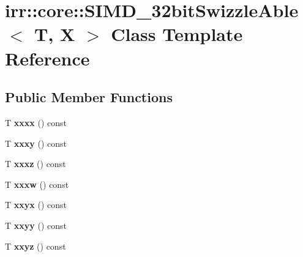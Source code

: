 \hypertarget{classirr_1_1core_1_1SIMD__32bitSwizzleAble}{}\section{irr\+:\+:core\+:\+:S\+I\+M\+D\+\_\+32bit\+Swizzle\+Able$<$ T, X $>$ Class Template Reference}
\label{classirr_1_1core_1_1SIMD__32bitSwizzleAble}
\subsection*{Public Member Functions}
\begin{DoxyCompactItemize}
\item 
T {\bfseries xxxx} () const \hypertarget{classirr_1_1core_1_1SIMD__32bitSwizzleAble_a349b647035bf88c400a5de3272bb9d5c}{}\label{classirr_1_1core_1_1SIMD__32bitSwizzleAble_a349b647035bf88c400a5de3272bb9d5c}

\item 
T {\bfseries xxxy} () const \hypertarget{classirr_1_1core_1_1SIMD__32bitSwizzleAble_a1e120fd9451d54c5c914043e8e805c4a}{}\label{classirr_1_1core_1_1SIMD__32bitSwizzleAble_a1e120fd9451d54c5c914043e8e805c4a}

\item 
T {\bfseries xxxz} () const \hypertarget{classirr_1_1core_1_1SIMD__32bitSwizzleAble_af677720c9f2859bd259862ac9d73e21e}{}\label{classirr_1_1core_1_1SIMD__32bitSwizzleAble_af677720c9f2859bd259862ac9d73e21e}

\item 
T {\bfseries xxxw} () const \hypertarget{classirr_1_1core_1_1SIMD__32bitSwizzleAble_ae6cb947906249ffe39a461a5f9459ba6}{}\label{classirr_1_1core_1_1SIMD__32bitSwizzleAble_ae6cb947906249ffe39a461a5f9459ba6}

\item 
T {\bfseries xxyx} () const \hypertarget{classirr_1_1core_1_1SIMD__32bitSwizzleAble_ad2ceeaf0ab7db8b0367d9d933553ff62}{}\label{classirr_1_1core_1_1SIMD__32bitSwizzleAble_ad2ceeaf0ab7db8b0367d9d933553ff62}

\item 
T {\bfseries xxyy} () const \hypertarget{classirr_1_1core_1_1SIMD__32bitSwizzleAble_af4a6a8d9d8b1c87a8335770b78d443d1}{}\label{classirr_1_1core_1_1SIMD__32bitSwizzleAble_af4a6a8d9d8b1c87a8335770b78d443d1}

\item 
T {\bfseries xxyz} () const \hypertarget{classirr_1_1core_1_1SIMD__32bitSwizzleAble_afdca2b3ad56723ad9ab6cf7a2b189696}{}\label{classirr_1_1core_1_1SIMD__32bitSwizzleAble_afdca2b3ad56723ad9ab6cf7a2b189696}


\end{DoxyCompactItemize}
